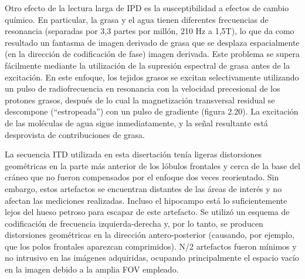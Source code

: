 \documentclass[12pt,a5,twoside]{book}
\begin{document}
Otro efecto de la lectura larga de IPD es la susceptibilidad a efectos de cambio químico. En particular, la grasa y el agua tienen diferentes frecuencias de resonancia (separadas por 3,3 partes por millón, 210 Hz a 1,5T), lo que da como resultado un fantasma de imagen derivado de grasa que se desplaza espacialmente (en la dirección de codificación de fase) imagen derivada. Este problema se supera fácilmente mediante la utilización de la supresión espectral de grasa antes de la excitación. En este enfoque, los tejidos grasos se excitan selectivamente utilizando un pulso de radiofrecuencia en resonancia con la velocidad precesional de los protones grasos, después de lo cual la magnetización transversal residual se descompone (``estropeada'') con un pulso de gradiente (figura 2.20). La excitación de las moléculas de agua sigue inmediatamente, y la señal resultante está desprovista de contribuciones de grasa.

La secuencia ITD utilizada en esta disertación tenía ligeras distorsiones geométricas en la parte más anterior de los lóbulos frontales y cerca de la base del cráneo que no fueron compensados por el enfoque dos veces reorientado. Sin embargo, estos artefactos se encuentran distantes de las áreas de interés y no afectan las mediciones realizadas. Incluso el hipocampo está lo suficientemente lejos del hueso petroso para escapar de este artefacto. Se utilizó un esquema de codificación de frecuencia izquierda-derecha y, por lo tanto, se producen distorsiones geométricas en la dirección antero-posterior (causando, por ejemplo, que los polos frontales aparezcan comprimidos). N/2 artefactos fueron mínimos y no intrusivo en las imágenes adquiridas, ocupando principalmente el espacio vacío en la imagen debido a la amplia FOV empleado.
\end{document}
